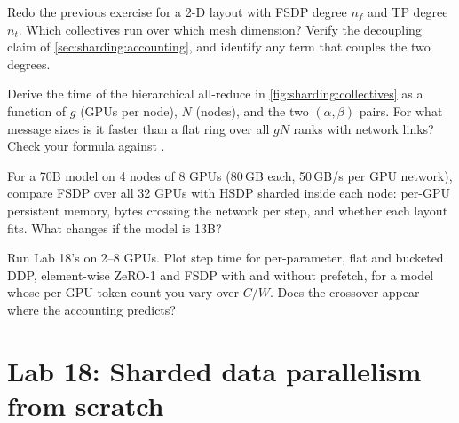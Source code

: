 \begin{exercise}[Accounting: 2-D]
Redo the previous exercise for a 2-D layout with FSDP degree $n_f$ and TP degree $n_t$. Which
collectives run over which mesh dimension? Verify the decoupling claim of
\cref{sec:sharding:accounting}, and identify any term that couples the two degrees.
\end{exercise}

\begin{exercise}
Derive the time of the hierarchical all-reduce in \cref{fig:sharding:collectives} as a function of
$g$ (GPUs per node), $N$ (nodes), and the two $(\alpha,\beta)$ pairs. For what message sizes is
it faster than a flat ring over all $gN$ ranks with network links? Check your formula against
.
\end{exercise}

\begin{exercise}
For a 70B model on 4 nodes of 8 GPUs (80\,GB each, 50\,GB/s per GPU network), compare FSDP over
all 32 GPUs with HSDP sharded inside each node: per-GPU persistent memory, bytes crossing the network
per step, and whether each layout fits. What changes if the model is 13B?
\end{exercise}

\begin{exercise}[Measurement]
Run Lab 18's  on 2--8 GPUs. Plot step time for per-parameter, flat and bucketed DDP,
element-wise ZeRO-1 and FSDP with and without prefetch, for a model whose per-GPU token count you
vary over $C/W$. Does the crossover appear where the accounting predicts?
\end{exercise}

\section{Lab 18: Sharded data parallelism from scratch}\label{sec:sharding:lab}

